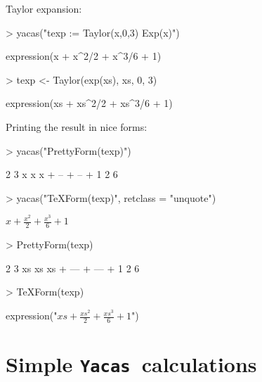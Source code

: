 \documentclass[]{article}
\def\yac{\texttt{Yacas}}
\begin{document}
Taylor expansion:
\begin{Schunk}
\begin{Sinput}
> yacas("texp := Taylor(x,0,3) Exp(x)")
\end{Sinput}
\begin{Soutput}
expression(x + x^2/2 + x^3/6 + 1)
\end{Soutput}
\end{Schunk}

\begin{Schunk}
\begin{Sinput}
> texp <- Taylor(exp(xs), xs, 0, 3)
\end{Sinput}
\begin{Soutput}
expression(xs + xs^2/2 + xs^3/6 + 1)
\end{Soutput}
\end{Schunk}


Printing the result in nice forms:
\begin{Schunk}
\begin{Sinput}
> yacas("PrettyForm(texp)") 
\end{Sinput}
\begin{Soutput}
     2    3    
    x    x     
x + -- + -- + 1
    2    6     
\end{Soutput}
\begin{Sinput}
> yacas("TeXForm(texp)", retclass = "unquote")
\end{Sinput}
\begin{Soutput}
$x + \frac{x ^{2}}{2}  + \frac{x ^{3}}{6}  + 1$
\end{Soutput}
\end{Schunk}

\begin{Schunk}
\begin{Sinput}
> PrettyForm(texp) 
\end{Sinput}
\begin{Soutput}
       2     3    
     xs    xs     
xs + --- + --- + 1
      2     6     
\end{Soutput}
\begin{Sinput}
> TeXForm(texp)
\end{Sinput}
\begin{Soutput}
expression("$xs + \frac{xs ^{2}}{2}  + \frac{xs ^{3}}{6}  + 1$")
\end{Soutput}
\end{Schunk}



\section{Simple \yac\ calculations}
\end{document}

